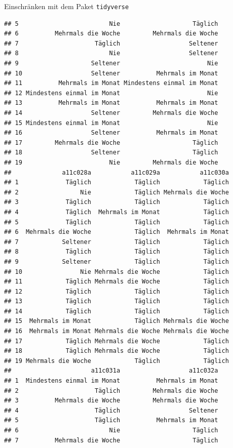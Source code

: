 \documentclass[ignorenonframetext,]{beamer}
\begin{document}
\begin{frame}[fragile]{Einschränken mit dem Paket \texttt{tidyverse}}
\begin{verbatim}
## 5                         Nie                    Täglich
## 6          Mehrmals die Woche         Mehrmals die Woche
## 7                     Täglich                   Seltener
## 8                         Nie                   Seltener
## 9                    Seltener                        Nie
## 10                   Seltener          Mehrmals im Monat
## 11          Mehrmals im Monat Mindestens einmal im Monat
## 12 Mindestens einmal im Monat                        Nie
## 13          Mehrmals im Monat          Mehrmals im Monat
## 14                   Seltener         Mehrmals die Woche
## 15 Mindestens einmal im Monat                        Nie
## 16                   Seltener          Mehrmals im Monat
## 17         Mehrmals die Woche                    Täglich
## 18                   Seltener                    Täglich
## 19                        Nie         Mehrmals die Woche
##              a11c028a           a11c029a           a11c030a
## 1             Täglich            Täglich            Täglich
## 2                 Nie            Täglich Mehrmals die Woche
## 3             Täglich            Täglich            Täglich
## 4             Täglich  Mehrmals im Monat            Täglich
## 5             Täglich            Täglich            Täglich
## 6  Mehrmals die Woche            Täglich  Mehrmals im Monat
## 7            Seltener            Täglich            Täglich
## 8             Täglich            Täglich            Täglich
## 9            Seltener            Täglich            Täglich
## 10                Nie Mehrmals die Woche            Täglich
## 11            Täglich Mehrmals die Woche            Täglich
## 12            Täglich            Täglich            Täglich
## 13            Täglich            Täglich            Täglich
## 14            Täglich            Täglich            Täglich
## 15  Mehrmals im Monat            Täglich Mehrmals die Woche
## 16  Mehrmals im Monat Mehrmals die Woche Mehrmals die Woche
## 17            Täglich Mehrmals die Woche            Täglich
## 18            Täglich Mehrmals die Woche            Täglich
## 19 Mehrmals die Woche            Täglich            Täglich
##                      a11c031a                   a11c032a
## 1  Mindestens einmal im Monat          Mehrmals im Monat
## 2                     Täglich         Mehrmals die Woche
## 3          Mehrmals die Woche         Mehrmals die Woche
## 4                     Täglich                   Seltener
## 5                     Täglich          Mehrmals im Monat
## 6                         Nie                    Täglich
## 7          Mehrmals die Woche                    Täglich

\end{verbatim}
\end{frame}
\end{document}

